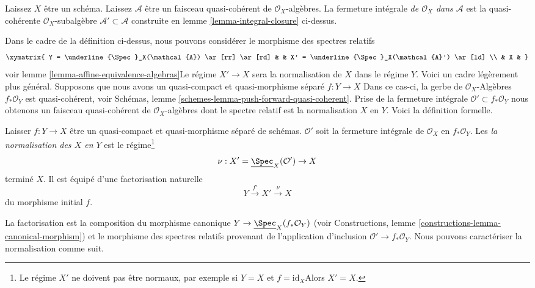 \begin{definition}

\label{definition-integral-closure}
Laissez $X$ être un schéma. Laissez $\mathcal{A}$ être un faisceau quasi-cohérent de $\mathcal{O}_X$-algèbres. La fermeture intégrale {\it de $\mathcal{O}_X$ dans $\mathcal{A}$} est la quasi-cohérente $\mathcal{O}_X$-subalgèbre $\mathcal{A}' \subset \mathcal{A}$ construite en lemme \ref{lemma-integral-closure} ci-dessus.
\end{definition}

\noindent

Dans le cadre de la définition ci-dessus, nous pouvons considérer le morphisme des spectres relatifs
$$
\xymatrix{
Y = \underline{\Spec}_X(\mathcal{A}) \ar[rr] \ar[rd] & &
X' = \underline{\Spec}_X(\mathcal{A}') \ar[ld] \\
& X &
}
$$
voir lemme \ref{lemma-affine-equivalence-algebras}Le régime $X' \to X$ sera la normalisation de $X$ dans le régime $Y$. Voici un cadre légèrement plus général. Supposons que nous avons un quasi-compact et quasi-morphisme séparé $f : Y \to X$
Dans ce cas-ci, la gerbe de
$\mathcal{O}_X$-Algèbres $f_*\mathcal{O}_Y$ est quasi-cohérent, voir Schémas, lemme \ref{schemes-lemma-push-forward-quasi-coherent}. Prise de la fermeture intégrale $\mathcal{O}' \subset f_*\mathcal{O}_Y$
nous obtenons un faisceau quasi-cohérent de $\mathcal{O}_X$-algèbres dont le spectre relatif est la normalisation $X$ en $Y$. Voici la définition formelle.

\begin{definition}

\label{definition-normalization-X-in-Y}

Laisser $f : Y \to X$ être un quasi-compact et quasi-morphisme séparé de schémas. $\mathcal{O}'$ soit la fermeture intégrale de $\mathcal{O}_X$ en
$f_*\mathcal{O}_Y$. Les {\it la normalisation des $X$ en $Y$} est le régime\footnote{Le régime $X'$ ne doivent pas être normaux, par exemple si
$Y = X$ et $f = \text{id}_X$Alors $X' = X$.}
$$
\nu : X' = \underline{\Spec}_X(\mathcal{O}') \to X
$$
terminé $X$. Il est équipé d'une factorisation naturelle
$$
Y \xrightarrow{f'} X' \xrightarrow{\nu} X
$$
du morphisme initial $f$.

\end{definition}

\noindent
La factorisation est la composition du morphisme canonique $Y \to \underline{\Spec}_X(f_*\mathcal{O}_Y)$ (voir Constructions, lemme \ref{constructions-lemma-canonical-morphism}) et le morphisme des spectres relatifs provenant de l'application d'inclusion $\mathcal{O}' \to f_*\mathcal{O}_Y$. Nous pouvons caractériser la normalisation comme suit.

